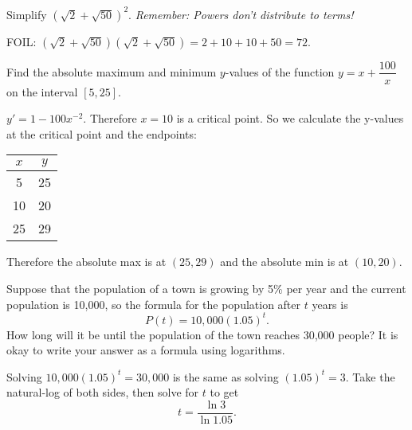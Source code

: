 \documentclass[12pt]{exam}
\begin{document}
\begin{questions}
\vfill


\question Simplify $(\sqrt{2} + \sqrt{50})^2$. \textit{Remember: Powers don't distribute to terms!}
\begin{solution}
FOIL: $(\sqrt{2} + \sqrt{50})(\sqrt{2} + \sqrt{50}) = 2 + 10 + 10 + 50 = 72$. 
\end{solution}
\vfill

\question Find the absolute maximum and minimum $y$-values of the function $y = x + \dfrac{100}{x}$ on the interval $[5,25]$.  
\begin{solution}
$y' = 1 - 100 x^{-2}$. Therefore $x = 10$ is a critical point.  So we calculate the y-values at the critical point and the endpoints:

\begin{tabular}{c|c}
$x$ & $y$ \\ \hline
5 & 25 \\
10 & 20 \\ 
25 & 29 
\end{tabular}

Therefore the absolute max is at $(25, 29)$ and the absolute min is at $(10,20)$.
\end{solution}
\vfill

\newpage

\question Suppose that the population of a town is growing by 5\% per year and the current population is 10{,}000, so the formula for the population after $t$ years is 
$$P(t) = 10{,}000 (1.05)^t.$$  
How long will it be until the population of the town reaches 30,000 people?  It is okay to write your answer as a formula using logarithms. 
\begin{solution}
Solving $10{,}000(1.05)^t = 30{,}000$ is the same as solving $(1.05)^t = 3$.  Take the natural-log of both sides, then solve for $t$ to get 
$$t = \dfrac{\ln 3}{\ln 1.05}.$$
\end{solution}
\vfill


\end{questions}
\end{document}
